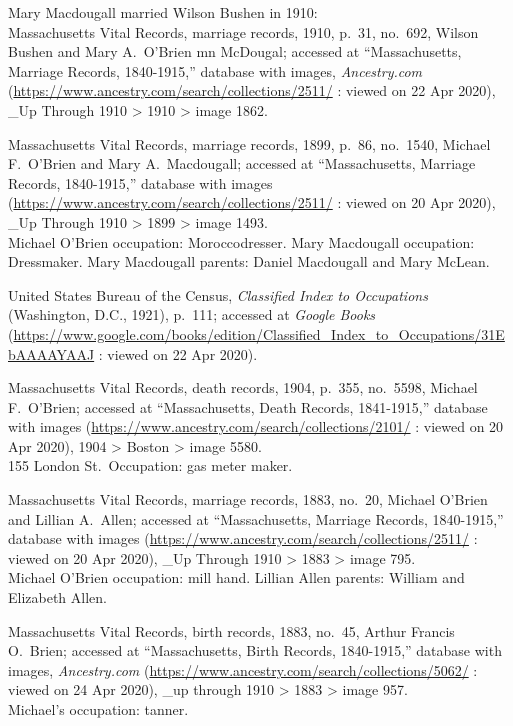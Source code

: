 \begin{thebibliography}{999}
Mary Macdougall married Wilson Bushen in 1910:\\

Massachusetts Vital Records, marriage records, 1910, p.\ 31, no.\ 692, Wilson Bushen and Mary A.\ O'Brien mn McDougal; accessed at ``Massachusetts, Marriage Records, 1840-1915,'' database with images, \textit{Ancestry.com} (\url{https://www.ancestry.com/search/collections/2511/} : viewed on 22 Apr 2020), \_Up Through 1910 > 1910 > image 1862.

Massachusetts Vital Records, marriage records, 1899, p.\ 86, no.\ 1540, Michael F.\ O'Brien and Mary A.\ Macdougall; accessed at ``Massachusetts, Marriage Records, 1840-1915,'' database with images (\url{https://www.ancestry.com/search/collections/2511/} : viewed on 20 Apr 2020), \_Up Through 1910 > 1899 > image 1493.\\
Michael O'Brien occupation: Moroccodresser. Mary Macdougall occupation: Dressmaker. Mary Macdougall parents: Daniel Macdougall and Mary McLean.

United States Bureau of the Census, \textit{Classified Index to Occupations} (Washington, D.C., 1921), p.\ 111; accessed at \textit{Google Books} (\url{https://www.google.com/books/edition/Classified_Index_to_Occupations/31EbAAAAYAAJ} : viewed on 22 Apr 2020).

Massachusetts Vital Records, death records, 1904, p.\ 355, no.\ 5598, Michael F.\ O'Brien; accessed at ``Massachusetts, Death Records, 1841-1915,'' database with images (\url{https://www.ancestry.com/search/collections/2101/} : viewed on 20 Apr 2020), 1904 > Boston > image 5580.\\
155 London St.\ Occupation: gas meter maker.

Massachusetts Vital Records, marriage records, 1883, no.\ 20, Michael O'Brien and Lillian A.\ Allen; accessed at ``Massachusetts, Marriage Records, 1840-1915,'' database with images (\url{https://www.ancestry.com/search/collections/2511/} : viewed on 20 Apr 2020), \_Up Through 1910 > 1883 > image 795.\\
Michael O'Brien occupation: mill hand. Lillian Allen parents: William and Elizabeth Allen.

Massachusetts Vital Records, birth records, 1883, no.\ 45, Arthur Francis O.\ Brien; accessed at ``Massachusetts, Birth Records, 1840-1915,'' database with images, \textit{Ancestry.com} (\url{https://www.ancestry.com/search/collections/5062/} : viewed on 24 Apr 2020), \_up through 1910 > 1883 > image 957.\\
Michael's occupation: tanner.


\end{thebibliography}
